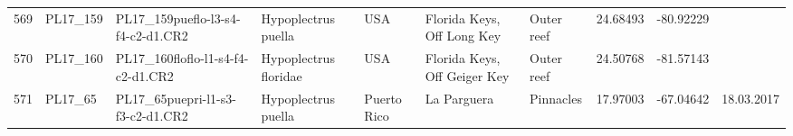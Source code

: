\begin{table}[ht]
\begin{tabular}{rlllllllll}
  569 & PL17\_159 & PL17\_159pueflo-l3-s4-f4-c2-d1.CR2 & Hypoplectrus puella & USA & Florida Keys, Off Long Key & Outer reef & 24.68493 & -80.92229 &  \\ 
  570 & PL17\_160 & PL17\_160floflo-l1-s4-f4-c2-d1.CR2 & Hypoplectrus floridae & USA & Florida Keys, Off Geiger Key & Outer reef & 24.50768 & -81.57143 &  \\ 
  571 & PL17\_65 & PL17\_65puepri-l1-s3-f3-c2-d1.CR2 & Hypoplectrus puella & Puerto Rico & La Parguera & Pinnacles & 17.97003 & -67.04642 & 18.03.2017 \\ 
   \hline
\end{tabular}
\end{table}
